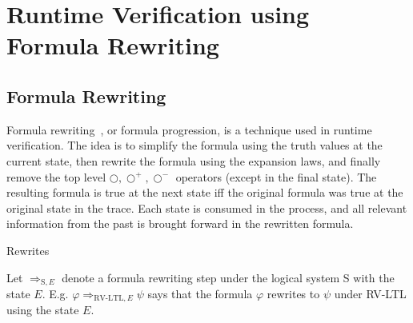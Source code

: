 \documentclass[a4paper]{article}
\newcommand{\tiff}{\text{ iff }}
\newcommand{\sn}{\bigcirc^+}
\newcommand{\wn}{\bigcirc^-}
\newcommand{\rw}[1]{\Rightarrow_{#1}}
\begin{document}




\section{Runtime Verification using Formula Rewriting}
\subsection{Formula Rewriting}
Formula rewriting~\autocite{rosu2005rewriting}, or formula progression, is a technique used in runtime verification.
The idea is to simplify the formula using the truth values at the current state, then rewrite the formula using the expansion laws, and finally remove the top level $\bigcirc,\sn,\wn$ operators (except in the final state). The resulting formula is true at the next state iff the original formula was true at the original state in the trace.
Each state is consumed in the process, and all relevant information from the past is brought forward in the rewritten formula.

\begin{notn}{Rewrites}

  Let $\rw{\text{S},E}$ denote a formula rewriting step under the logical system S with the state $E$. E.g. $\varphi\rw{\text{RV-LTL},E}\psi$ says that the formula $\varphi$ rewrites to $\psi$ under RV-LTL using the state $E$.
\end{notn}
\end{document}
